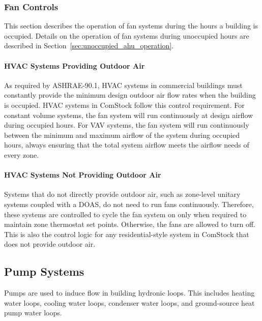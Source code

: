 

\subsubsection{Fan Controls}

This section describes the operation of fan systems during the hours a building is occupied. Details on the operation of fan systems during unoccupied hours are described in Section~\ref{sec:unoccupied_ahu_operation}.

\paragraph{HVAC Systems Providing Outdoor Air}

As required by ASHRAE-90.1, HVAC systems in commercial buildings must constantly provide the minimum design outdoor air flow rates when the building is occupied. HVAC systems in ComStock follow this control requirement. For constant volume systems, the fan system will run continuously at design airflow during occupied hours. For VAV systems, the fan system will run continuously between the minimum and maximum airflow of the system during occupied hours, always ensuring that the total system airflow meets the airflow needs of every zone.

\paragraph{HVAC Systems Not Providing Outdoor Air}

Systems that do not directly provide outdoor air, such as zone-level unitary systems coupled with a DOAS, do not need to run fans continuously. Therefore, these systems are controlled to cycle the fan system on only when required to maintain zone thermostat set points. Otherwise, the fans are allowed to turn off. This is also the control logic for any residential-style system in ComStock that does not provide outdoor air.

\subsection{Pump Systems}

Pumps are used to induce flow in building hydronic loops. This includes heating water loops, cooling water loops, condenser water loops, and ground-source heat pump water loops.

